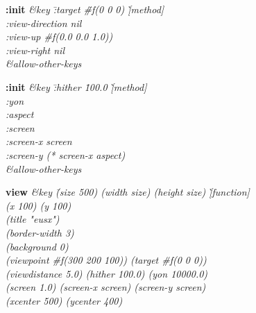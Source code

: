 {\newpage
\clearpage
\samepage 
}

{\newpage
\clearpage
\samepage 
\begin{figure}\begin{center}
\end{center}

\end{figure}
}

{\newpage
\clearpage
\samepage 
\begin{emtabbing}{\bf :init} 
\it 
\&key  \= :target \hspace{12mm} \=  \#f(0 0 0) \` [method]\\  
       \> :view-direction \> nil \\  
       \> :view-up \>  \#f(0.0 0.0 1.0)) \\  
       \> :view-right \>  nil \\  
       \> \&allow-other-keys
\rm
\end{emtabbing}
}

{\newpage
\clearpage
\samepage 
\begin{emtabbing}{\bf :init} 
\it 
\&key \= :hither  \hspace{5mm} \= 100.0 \`[method]\\  
      \> :yon     \\  
      \> :aspect   \\  
      \> :screen  \\  
      \> :screen-x  \> screen \\  
      \> :screen-y \> (* screen-x aspect) \\  
      \>  \&allow-other-keys
\rm
\end{emtabbing}
}

{\newpage
\clearpage
\samepage 
\begin{emtabbing}{\bf view} 
\it \&key \= (size 500) (width size) (height size)
\`[function] \\  
\> (x 100) (y 100) \\  
\> (title "eusx") \\  
\> (border-width 3) \\  
\> (background 0) \\  
\> (viewpoint \#f(300 200 100)) (target \#f(0 0 0)) \\  
\> (viewdistance 5.0)  (hither 100.0) (yon 10000.0) \\  
\> (screen 1.0) (screen-x screen) (screen-y screen) \\  
\> (xcenter 500) (ycenter 400) \\  
\rm
\end{emtabbing}
}

